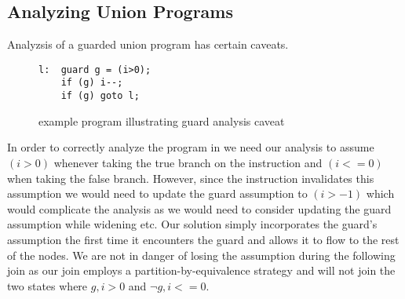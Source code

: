 \subsection{Analyzing Union Programs}
Analyzsis of a guarded union program has certain caveats.
\begin{figure}[ht]
\begin{lstlisting}
l:  guard g = (i>0);
    if (g) i--;
    if (g) goto l;
\end{lstlisting}
\caption{example program illustrating guard analysis caveat}
\end{figure}
In order to correctly analyze the program in  we need our analysis to assume $(i>0)$ whenever taking the true branch on the  instruction and $(i<=0)$ when taking the false branch. However, since the  instruction invalidates this assumption we would need to update the guard assumption to $(i>-1)$ which would complicate the analysis as we would need to consider updating the guard assumption while widening etc. Our solution simply incorporates the guard's assumption the first time it encounters the guard and allows it to flow to the rest of the nodes. We are not in danger of losing the assumption during the following join as our join employs a partition-by-equivalence strategy and will not join the two states where ${g,i>0}$ and ${\neg{g},i<=0}$.

